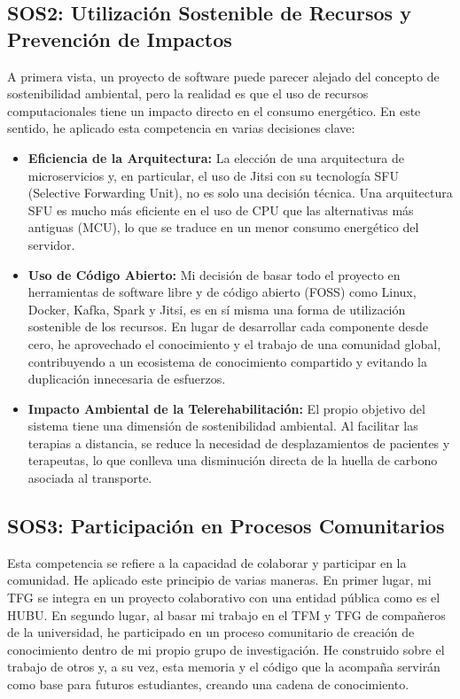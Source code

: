\subsection{SOS2: Utilización Sostenible de Recursos y Prevención de Impactos}
A primera vista, un proyecto de software puede parecer alejado del concepto de sostenibilidad ambiental, pero la realidad es que el uso de recursos computacionales tiene un impacto directo en el consumo energético. En este sentido, he aplicado esta competencia en varias decisiones clave:
\begin{itemize}
    \item \textbf{Eficiencia de la Arquitectura:} La elección de una arquitectura de microservicios y, en particular, el uso de Jitsi con su tecnología SFU (Selective Forwarding Unit), no es solo una decisión técnica. Una arquitectura SFU es mucho más eficiente en el uso de CPU que las alternativas más antiguas (MCU), lo que se traduce en un menor consumo energético del servidor.
    \item \textbf{Uso de Código Abierto:} Mi decisión de basar todo el proyecto en herramientas de software libre y de código abierto (FOSS) como Linux, Docker, Kafka, Spark y Jitsi, es en sí misma una forma de utilización sostenible de los recursos. En lugar de desarrollar cada componente desde cero, he aprovechado el conocimiento y el trabajo de una comunidad global, contribuyendo a un ecosistema de conocimiento compartido y evitando la duplicación innecesaria de esfuerzos.
    \item \textbf{Impacto Ambiental de la Telerehabilitación:} El propio objetivo del sistema tiene una dimensión de sostenibilidad ambiental. Al facilitar las terapias a distancia, se reduce la necesidad de desplazamientos de pacientes y terapeutas, lo que conlleva una disminución directa de la huella de carbono asociada al transporte.
\end{itemize}

\subsection{SOS3: Participación en Procesos Comunitarios}
Esta competencia se refiere a la capacidad de colaborar y participar en la comunidad. He aplicado este principio de varias maneras. En primer lugar, mi TFG se integra en un proyecto colaborativo con una entidad pública como es el HUBU. En segundo lugar, al basar mi trabajo en el TFM y TFG de compañeros de la universidad, he participado en un proceso comunitario de creación de conocimiento dentro de mi propio grupo de investigación. He construido sobre el trabajo de otros y, a su vez, esta memoria y el código que la acompaña servirán como base para futuros estudiantes, creando una cadena de conocimiento.

